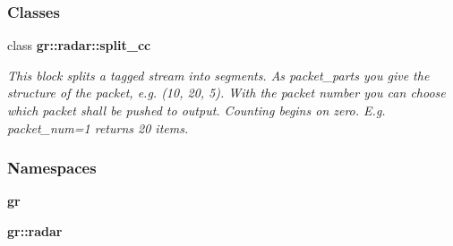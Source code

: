 \subsubsection*{Classes}
\begin{DoxyCompactItemize}
\item 
class {\bf gr\+::radar\+::split\+\_\+cc}
\begin{DoxyCompactList}\small\item\em This block splits a tagged stream into segments. As packet\+\_\+parts you give the structure of the packet, e.\+g. (10, 20, 5). With the packet number you can choose which packet shall be pushed to output. Counting begins on zero. E.\+g. packet\+\_\+num=1 returns 20 items. \end{DoxyCompactList}\end{DoxyCompactItemize}
\subsubsection*{Namespaces}
\begin{DoxyCompactItemize}
\item 
 {\bf gr}
\item 
 {\bf gr\+::radar}
\end{DoxyCompactItemize}
